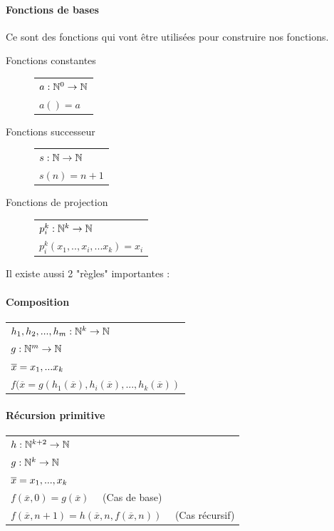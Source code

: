 \paragraph{Fonctions de bases} Ce sont des fonctions qui vont être utilisées 
pour construire nos fonctions.

\begin{description}
	\item[Fonctions constantes] 
		\begin{tabular}{|l|}
			\hline
			$a: \mathbb{N}^0 \rightarrow \mathbb{N}$\\
			$a() = a$\\
			\hline
		\end{tabular}
	\item[Fonctions successeur] 
		\begin{tabular}{|l|}
			\hline
			$s: \mathbb{N} \rightarrow \mathbb{N}$\\
			$s(n) = n + 1$\\
			\hline
		\end{tabular}
	\item[Fonctions de projection] 
		\begin{tabular}{|l|}
			\hline
			$p^k_i: \mathbb{N}^k \rightarrow \mathbb{N}$\\
			$p^k_i(x_1,..,x_i,...x_k) = x_i$\\
			\hline
		\end{tabular}
\end{description}

Il existe aussi 2 "règles" importantes :
\paragraph{Composition}
\begin{tabular}{|l|}
	\hline
	$h_1, h_2,...,h_m: \mathbb{N}^k \rightarrow \mathbb{N}$\\
	$g: \mathbb{N}^m \rightarrow \mathbb{N}$\\
	$\overline{x} =x_1,...x_k$ \\
	$f(\overline{x} = 
	g(h_1(\overline{x}),h_i(\overline{x}),...,h_k(\overline{x}))$\\
	\hline
\end{tabular}

\paragraph{Récursion primitive}
\begin{tabular}{|l|}
	\hline
	$h: \mathbb{N}^{k+2} \rightarrow \mathbb{N}$\\
	$g: \mathbb{N}^k \rightarrow \mathbb{N}$\\
	$\overline{x} =x_1,...,x_k$ \\
	$f(\overline{x}, 0) = g(\overline{x}) \quad$ (Cas de base)\\
	$f(\overline{x}, n+1) = 
	h(\overline{x},n, f(\overline{x}, n))\quad$ (Cas récursif)\\
	\hline
\end{tabular}

